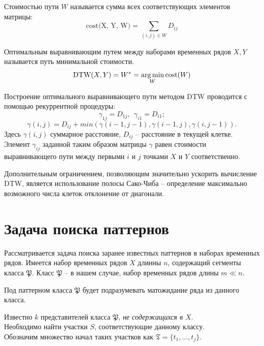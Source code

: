 \documentclass[12pt,twoside]{article}
\begin{document}
        \begin{Def}
            Стоимостью пути $W$ называется сумма всех соответствующих элементов матрицы:
            $$\text{cost(X, Y, W)} = \sum\limits_{(i, j)\in W} D_{ij}$$
        \end{Def}
        \begin{Def}
            Оптимальным выравнивающим путем между наборами временных рядов $X, Y$ называется путь минимальной стоимости. $$\text{DTW}(X, Y) = W^* = \argmin\limits_{W}\text{cost}(W)$$
        \end{Def}

        Построение оптимального выравнивающего пути методом DTW проводится с помощью рекуррентной процедуры:
        $$\gamma_{1j} = D_{1j},\ \ \gamma_{i1} = D_{i1};$$
        $$\gamma(i, j) = D_{ij} + min({\gamma(i-1, j-1), \gamma(i-1, j), \gamma(i, j-1)}).$$
        Здесь $\gamma(i, j)$ суммарное расстояние, $D_{ij}$ \--- расстояние в текущей клетке. Элемент $\gamma_{ij}$ заданной таким образом матрицы $\gamma$ равен стоимости выравнивающего пути между первыми $i$ и $j$ точками $X$ и $Y$ соответственно.

        
        Дополнительным ограничением, позволяющим значительно ускорить вычисление DTW, является использование полосы Сако\--Чиба \--- определение максимально возможного числа клеток отклонение от диагонали.
                
    \label{sec:search}\section{Задача поиска паттернов}
        
        Рассматривается задача поиска заранее известных паттернов в наборах временных рядов.
        Имеется набор временных рядов $X$ длинны $n$, содержащий сегменты класса $\mathfrak{P}$.
        Класс $\mathfrak{P}$ \--- в нашем случае, набор временных рядов длины $m \ll n$. \\
        \begin{Def}{}
            Под паттерном класса $\mathfrak{P}$ будет подразумевать матожидание ряда из данного класса.
        \end{Def}
        
        Известно $k$ представителей класса $\mathfrak{P}$, \textit{не содержащихся в $X$}. \\
        Необходимо найти участки $S$, соответствующие данному классу. \\
        Обозначим множество начал таких участков как $\mathfrak{T} = \{t_1, \dots, t_j \}$.
\end{document}
